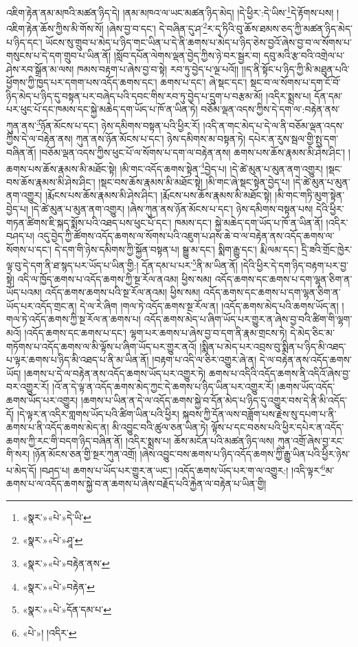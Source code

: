 འཇིག་རྟེན་ནམ་མཁའི་མཚན་ཉིད་དེ། །ནམ་མཁའ་ལ་ཡང་མཚན་ཉིད་མེད། །དེ་ཕྱིར་:དེ་ཡིས་\footnote{«སྣར་»«པེ་»དེ་ཡི་}དེ་རྟོགས་པས། །འཇིག་རྟེན་ཆོས་ཀྱིས་མི་གོས་སོ། །ཞེས་བྱ་བ་དང་། དེ་བཞིན་དུ་ཤ་\footnote{«སྣར་»«པེ་»ཤཱ་}ར་དྭ་ཏིའི་བུ་ཆོས་ཐམས་ཅད་ཀྱི་མཚན་ཉིད་མེད་པ་ཉིད་དང་། ཡོངས་སུ་གྲུབ་པ་མེད་པ་ཉིད་གང་ཡིན་པ་དེ་ནི་ཆགས་པ་མེད་པ་ཉིད་ཅེས་བྱའོ་ཞེས་བྱ་བ་ལ་སོགས་པ་གསུངས་པ་དེ་དག་གྲུབ་པ་ཡིན་ནོ། །སློབ་དཔོན་ལེགས་ལྡན་བྱེད་ཀྱིས་ཉེ་བར་སྦྱར་བ། དབུ་མའི་རྩ་བའི་འགྲེལ་པ་ཤེས་རབ་སྒྲོན་མ་ལས། ཁམས་བརྟག་པ་ཞེས་བྱ་བ་སྟེ། རབ་ཏུ་བྱེད་པ་ལྔ་པའོ།། །།ད་ནི་སྟོང་པ་ཉིད་ཀྱི་མི་མཐུན་པའི་ཕྱོགས་ཀྱི་ཁྱད་པར་དགག་པས་འདོད་ཆགས་དང་། ཆགས་པ་དང་། ཞེ་སྡང་དང་། སྡང་བ་ལ་སོགས་པ་དག་ངོ་བོ་ཉིད་མེད་པ་ཉིད་དུ་བསྟན་པར་བཞེད་པའི་དབང་གིས་རབ་ཏུ་བྱེད་པ་དྲུག་པ་བརྩམ་མོ། །འདིར་སྨྲས་པ། དོན་དམ་པར་ཕུང་པོ་དང་ཁམས་དང་སྐྱེ་མཆེད་དག་ཡོད་པ་ཁོ་ན་ཡིན་ཏེ། བཅོམ་ལྡན་འདས་ཀྱིས་དེ་དག་ལ་:བརྟེན་ནས་ཀུན་ནས་\footnote{«སྣར་»«པེ་»བརྟེན་ནས་}ཉོན་མོངས་པ་དང་། ཉེས་དམིགས་བསྟན་པའི་ཕྱིར་རོ། །འདི་ན་གང་མེད་པ་དེ་ལ་ནི་བཅོམ་ལྡན་འདས་ཀྱིས་དེ་ལ་བརྟེན་ནས། ཀུན་ནས་ཉོན་མོངས་པ་དང་། ཉེས་དམིགས་མ་བསྟན་ཏེ། དཔེར་ན་རུས་སྦལ་གྱི་སྤུ་དག་བཞིན་ནོ། །བཅོམ་ལྡན་འདས་ཀྱིས་ཕུང་པོ་ལ་སོགས་པ་དག་ལ་བརྟེན་ནས། ཆགས་པས་ཆོས་རྣམས་མི་ཤེས་ཤིང་། །ཆགས་པས་ཆོས་རྣམས་མི་མཐོང་སྟེ། །མི་གང་འདོད་ཆགས་སྟེན་\footnote{«སྣར་»«པེ་»བརྟེན་}བྱེད་པ། །དེ་ཚེ་མུན་པ་མུན་ནག་འགྱུར། །སྡང་བས་ཆོས་རྣམས་མི་ཤེས་ཤིང་། །སྡང་བས་ཆོས་རྣམས་མི་མཐོང་སྟེ། །མི་གང་ཞེ་སྡང་སྟེན་བྱེད་པ། །དེ་ཚེ་མུན་པ་མུན་ནག་འགྱུར། །རྨོངས་པས་ཆོས་རྣམས་མི་ཤེས་ཤིང་། །རྨོངས་པས་ཆོས་རྣམས་མི་མཐོང་སྟེ། །མི་གང་གཏི་མུག་སྟེན་བྱེད་པ། །དེ་ཚེ་མུན་པ་མུན་ནག་འགྱུར། །ཞེས་ཀུན་ནས་ཉོན་མོངས་པ་དང་། ཉེས་དམིགས་བསྟན་པས། དེའི་ཕྱིར་གཏན་ཚིགས་ཇི་སྐད་སྨོས་པའི་འཐད་པས་ཕུང་པོ་དང་། ཁམས་དང་། སྐྱེ་མཆེད་དག་ཡོད་པ་ཁོ་ན་ཡིན་ནོ། །འདིར་བཤད་པ། འདུ་བྱེད་ཀྱི་ཚོགས་འདོད་ཆགས་ལ་སོགས་པའི་འཇུག་པ་ཤས་ཆེ་བ་ལ་བརྟེན་ནས་འདོད་ཆགས་ལ་སོགས་པ་དང་། དེ་དག་གི་ཉེས་དམིགས་ཀྱི་སྐྱོན་བསྟན་པ། སྒྱུ་མ་དང་། སྨིག་རྒྱུ་དང་། རྨི་ལམ་དང་། དྲི་ཟའི་གྲོང་ཁྱེར་ལྟ་བུ་དེ་དག་ནི་ཐ་སྙད་པར་ཡོད་པ་ཡིན་གྱི:། དོན་དམ་པ་པར་\footnote{«སྣར་»«པེ་»དོན་དམ་པ་}ནི་མ་ཡིན་ནོ། །དེའི་ཕྱིར་དེ་དག་ཉིད་བརྟག་པར་བྱ་སྟེ། འདི་ལ་ཁྱོད་ཆགས་པ་འདོད་ཆགས་ཀྱི་སྔ་རོལ་ནའམ། ཕྱིས་སམ། འདོད་ཆགས་དང་ཆགས་པ་དག་ལྷན་ཅིག་ན་ཡོད་པའམ། འདོད་ཆགས་ཆགས་པའི་སྔ་རོལ་ནའམ། ཕྱིས་སམ། འདོད་ཆགས་དང་ཆགས་པ་དག་ལྷན་ཅིག་ན་ཡོད་པར་འདོད་གྲང་ན། དེ་ལ་རེ་ཞིག །གལ་ཏེ་འདོད་ཆགས་སྔ་རོལ་ན། །འདོད་ཆགས་མེད་པའི་ཆགས་ཡོད་ན། །གལ་ཏེ་འདོད་ཆགས་ཀྱི་སྔ་རོལ་ན་ཆགས་པ། འདོད་ཆགས་མེད་པ་ཞིག་ཡོད་པར་གྱུར་ན་ཞེས་བྱ་བའི་ཚིག་གི་ལྷག་མའོ། །འདོད་ཆགས་དང་ཆགས་པ་དང་། ལྷག་པར་ཆགས་པ་ཞེས་བྱ་བ་དག་ནི་རྣམ་གྲངས་ཏེ། དེ་མེད་ཅིང་མ་གཏོགས་པ་འདོད་ཆགས་ལ་མི་ལྟོས་པ་ཞིག་ཡོད་པར་གྱུར་ནའོ། །སྨིན་པ་མེད་པར་འབྲས་བུ་སྨིན་པ་ཉིད་མི་འཐད་པ་ལྟར་ཆགས་པ་ཉིད་མི་འཐད་པ་ནི་མ་ཡིན་ནོ། །བརྟག་པ་འདི་ལ་ཅིར་འགྱུར་ཞེ་ན། དེ་ལ་བརྟེན་ནས་འདོད་ཆགས་ཡོད། །ཆགས་པ་དེ་ལ་བརྟེན་ནས་འདོད་ཆགས་ཡོད་པར་འགྱུར་ཏེ། ཆགས་པ་འདིའི་འདོད་ཆགས་ནི་འདིའོ་ཞེས་བྱ་བར་འགྱུར་རོ། །འོ་ན་དེ་ལྟ་ན་འདོད་ཆགས་མེད་ཀྱང་དེ་ཆགས་པ་ཉིད་ཡིན་པར་འགྱུར་རོ། །ཆགས་ཡོད་འདོད་ཆགས་ཡོད་པར་འགྱུར། །ཆགས་པ་ཡིན་ན་དེ་ལ་འདོད་ཆགས་སྐྱེ་བ་དོན་མེད་པ་ཉིད་དུ་འགྱུར་བས་དེ་ནི་མི་འདོད་དོ། །དེ་ལྟར་ན་འདིར་གླགས་ཡོད་པའི་ཚིག་ཡིན་པའི་ཕྱིར། སྐབས་ཀྱི་དོན་ལས་བཟློག་པས་རྗེས་སུ་དཔག་པ་ནི་ཆགས་པ་ནི་འདོད་ཆགས་མེད་ན། མི་འབྱུང་བའི་ཚུལ་ཅན་ཡིན་ཏེ། ལྟོས་པ་དང་བཅས་པའི་ཕྱིར་དཔེར་ན་འདོད་ཆགས་ཀྱི་རང་གི་བདག་ཉིད་བཞིན་ནོ། །འདིར་སྨྲས་པ། ཆོས་མངོན་པའི་མཚན་ཉིད་ལས། ཀུན་འགྲོ་ཞེས་བྱ་རང་གི་སར། །ཉོན་མོངས་ཅན་གྱི་སྔར་ཀུན་འགྲོ། །ཞེས་འབྱུང་བས་ཆགས་པ་ཉིད་འདོད་ཆགས་ཀྱི་རྒྱུ་ཡིན་པའི་ཕྱིར་ཉེས་པ་མེད་དོ། །བཤད་པ། ཆགས་པ་ཡོད་པར་གྱུར་ན་ཡང་། །འདོད་ཆགས་ཡོད་པར་ག་ལ་འགྱུར:། །འདི་ལྟར་\footnote{«པེ་»། །འདིར་}མ་ཆགས་པ་ལ་འདོད་ཆགས་སྐྱེ་བ་ན་ཆགས་པ་ཞེས་བརྗོད་པའི་རྐྱེན་ལ་བརྟེན་པ་ཡིན་གྱི། 